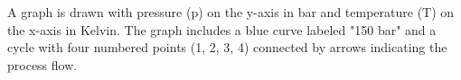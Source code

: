 A graph is drawn with pressure (p) on the y-axis in bar and temperature (T) on the x-axis in Kelvin. The graph includes a blue curve labeled "150 bar" and a cycle with four numbered points (1, 2, 3, 4) connected by arrows indicating the process flow.